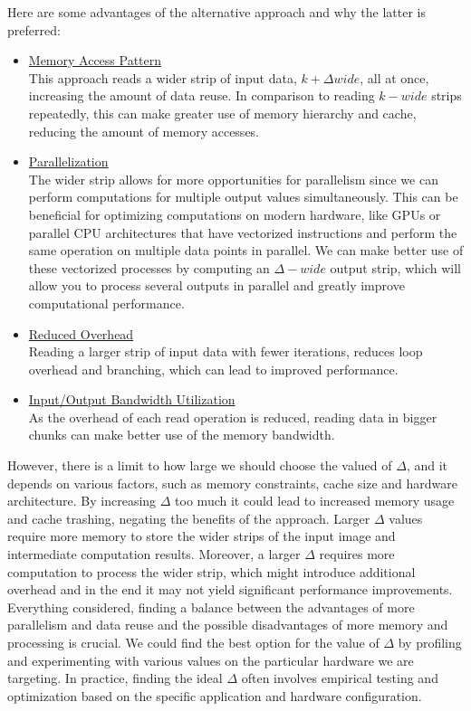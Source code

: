 Here are some advantages of the alternative approach and why the latter is preferred:
\begin{itemize}
	\item \underline{Memory Access Pattern}\\
	This approach reads a wider strip of input data, $k+\Delta wide$, all at once, increasing the amount of data reuse. In comparison to reading $k-wide$ strips repeatedly, this can make greater use of memory hierarchy and cache, reducing the amount of memory accesses.
	\item \underline{Parallelization}\\
	The wider strip allows for more opportunities for parallelism since we can perform computations for multiple output values simultaneously. This can be beneficial for optimizing computations on modern hardware, like GPUs or parallel CPU architectures that have vectorized instructions and perform the same operation on multiple data points in parallel. We can make better use of these vectorized processes by computing an $\Delta-wide$ output strip, which will allow you to process several outputs in parallel and greatly improve computational performance.
	\item \underline{Reduced Overhead}\\
	Reading a larger strip of input data with fewer iterations, reduces loop overhead and branching, which can lead to improved performance.
	\item \underline{Input/Output Bandwidth Utilization}\\
	As the overhead of each read operation is reduced, reading data in bigger chunks can make better use of the memory bandwidth.
\end{itemize}

However, there is a limit to how large we should choose the valued of $\Delta$, and it depends on various factors, such as memory constraints, cache size and hardware architecture. By increasing $\Delta$ too much it could lead to increased memory usage and cache trashing, negating the benefits of the approach. Larger $\Delta$ values require more memory to store the wider strips of the input image and intermediate computation results. Moreover, a larger $\Delta$ requires more computation to process the wider strip, which might introduce additional overhead and in the end it may not yield significant performance improvements.\\

Everything considered, finding a balance between the advantages of more parallelism and data reuse and the possible disadvantages of more memory and processing is crucial. We could find the best option for the value of $\Delta$ by profiling and experimenting with various values on the particular hardware we are targeting. In practice, finding the ideal $\Delta$ often involves empirical testing and optimization based on the specific application and hardware configuration. \\


